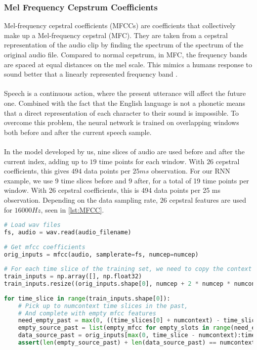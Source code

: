 \subsubsection{Mel Frequency Cepstrum Coefficients}
Mel-frequency cepstral coefficients (MFCCs) are coefficients that collectively make up a Mel-frequency cepstral (MFC). 
They are taken from a cepstral representation of the audio clip by finding the spectrum of the spectrum of the original audio file.
 Compared to normal cepstrum, in MFC, the frequency bands are spaced at equal distances on the mel scale.
 This mimics a humans response to sound better that a linearly represented frequency band \cite{sahidullah2012design}.\\\\
Speech is a continuous action, where the present utterance will affect the future one. Combined with the fact that the English language is not a phonetic means that a direct
representation of each character to their sound is impossible. To overcome this problem, the neural network is trained on overlapping windows both before and after the current speech sample.\\\\
In the model developed by us, nine slices of audio are used before and after the current index, adding up to $19$ time points for each window. With $26$ cepstral coefficients, this gives $494$ data points per $25ms$ observation.
For our RNN example, we use 9 time slices before and 9 after, for a total of 19 time points per window. With 26 cepstral coefficients, this is 494 data points per 25 ms observation. Depending on the data sampling rate, $26$ cepstral features are used for $16 000 Hz$, seen in \ref{lst:MFCC}.

\begin{lstlisting}[language = Python, label=lst:MFCC, caption = Example code to obtain MFCC features.]
# Load wav files
fs, audio = wav.read(audio_filename)
 
# Get mfcc coefficients
orig_inputs = mfcc(audio, samplerate=fs, numcep=numcep)
 
# For each time slice of the training set, we need to copy the context this makes
train_inputs = np.array([], np.float32)
train_inputs.resize((orig_inputs.shape[0], numcep + 2 * numcep * numcontext))
 
for time_slice in range(train_inputs.shape[0]):
    # Pick up to numcontext time slices in the past,
    # And complete with empty mfcc features
    need_empty_past = max(0, ((time_slices[0] + numcontext) - time_slice))
    empty_source_past = list(empty_mfcc for empty_slots in range(need_empty_past))
    data_source_past = orig_inputs[max(0, time_slice - numcontext):time_slice]
    assert(len(empty_source_past) + len(data_source_past) == numcontext)
\end{lstlisting}
 
